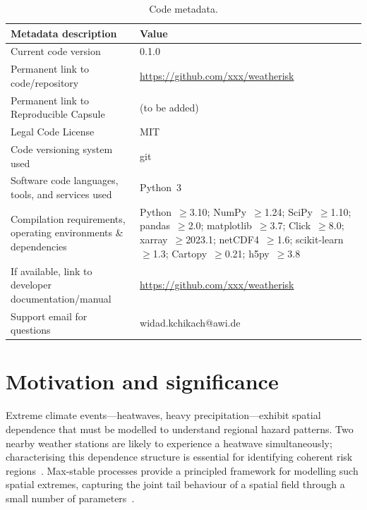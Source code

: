\documentclass[a4paper]{elsarticle}
\begin{document}
\begin{table}[!ht]
\caption{Code metadata.}\label{tab:metadata}
\centering
\footnotesize
\begin{tabular}{@{}p{4.5cm}p{7.2cm}@{}}
\toprule
\textbf{Metadata description} & \textbf{Value} \\
\midrule
Current code version & 0.1.0 \\
Permanent link to code/repository & \url{https://github.com/xxx/weatherisk} \\
Permanent link to Reproducible Capsule & (to be added) \\
Legal Code License & MIT \\
Code versioning system used & git \\
Software code languages, tools, and services used & Python~3 \\
Compilation requirements, operating environments \& dependencies &
  Python~$\geq$3.10; NumPy~$\geq$1.24; SciPy~$\geq$1.10;
  pandas~$\geq$2.0; matplotlib~$\geq$3.7; Click~$\geq$8.0;
  xarray~$\geq$2023.1; netCDF4~$\geq$1.6;
  scikit-learn~$\geq$1.3; Cartopy~$\geq$0.21;
  h5py~$\geq$3.8 \\
If available, link to developer documentation/manual &
  \url{https://github.com/xxx/weatherisk} \\
Support email for questions & widad.kchikach@awi.de \\
\bottomrule
\end{tabular}
\end{table}

\section{Motivation and significance}
\label{sec:motivation}

Extreme climate events---heatwaves, heavy precipitation---exhibit
spatial dependence that must be modelled to understand regional
hazard patterns.
Two nearby weather stations are likely to experience a heatwave
simultaneously; characterising this dependence structure is essential
for identifying coherent risk regions~\cite{davison2012}.
Max-stable processes provide a principled framework for modelling
such spatial extremes, capturing the joint tail behaviour of a
spatial field through a small number of
parameters~\cite{dehaan2006,padoan2010}.
\end{document}
